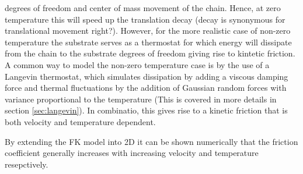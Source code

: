 degrees of freedom and center of mass movement of the chain. Hence, at zero
temperature this will speed up the translation decay (decay is synonymous
for translational movement right?). However, for the more realistic case of non-zero temperature the substrate serves as a thermostat for which energy will
dissipate from the chain to the substrate degrees of freedom giving rise to
kintetic friction. A common way to model the non-zero temperature case is by the
use of a Langevin thermostat, which simulates dissipation by adding a viscous
damping force and thermal fluctuations by the addition of Gaussian random forces
with variance proportional to the temperature (This is covered in more details
in section \ref{sec:langevin}). In combinatio, this gives rise to a kinetic friction that is both velocity and temperature dependent. 

By extending the FK model into 2D \cite{FK2D} it can be shown numerically that the friction coefficient generally increases with increasing velocity and temperature resepctively. 
















